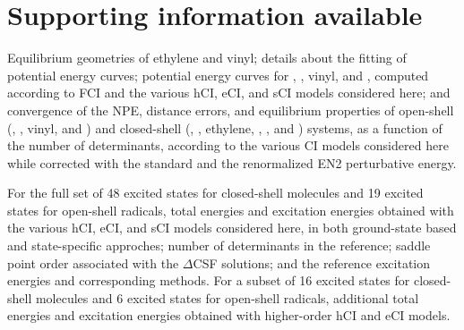 \documentclass[aip,jcp,reprint,noshowkeys,superscriptaddress]{revtex4-1}
\begin{document}
\section*{Supporting information available}
\label{sec:SI}

Equilibrium geometries of ethylene and vinyl; details about the fitting of potential energy curves;
potential energy curves for , , vinyl, and ,
computed according to FCI and the various hCI, eCI, and sCI models considered here;
and convergence of the NPE, distance errors, and equilibrium properties of
open-shell (, , vinyl, and )
and closed-shell (, , ethylene, , , and ) systems,
as a function of the number of determinants, according to the various CI models considered here while
corrected with the standard and the renormalized EN2 perturbative energy.

For the full set of 48 excited states for closed-shell molecules and 19 excited states for open-shell radicals,
total energies and excitation energies obtained with 
the various hCI, eCI, and sCI models considered here, in both ground-state based and state-specific approches;
number of determinants in the reference; saddle point order associated with the $\Delta$CSF solutions;
and the reference excitation energies and corresponding methods.
For a subset of 16 excited states for closed-shell molecules and 6 excited states for open-shell radicals,
additional total energies and excitation energies obtained with higher-order hCI and eCI models.





\end{document}
